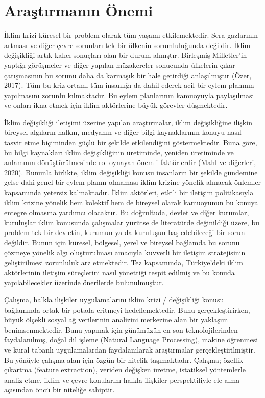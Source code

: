 \documentclass[
]{book}
\begin{document}
\hypertarget{araux15ftux131rmanux131n-uxf6nemi}{%
\section{Araştırmanın Önemi}\label{araux15ftux131rmanux131n-uxf6nemi}}

İklim krizi küresel bir problem olarak tüm yaşamı etkilemektedir. Sera gazlarının artması ve diğer çevre sorunları tek bir ülkenin sorumluluğunda değildir. İklim değişikliği artık kalıcı sonuçları olan bir durum almıştır. Birleşmiş Milletler'in yaptığı görüşmeler ve diğer yapılan müzakereler sonucunda ülkelerin çıkar çatışmasının bu sorunu daha da karmaşık bir hale getirdiği anlaşılmıştır (Özer, 2017). Tüm bu kriz ortamı tüm insanlığı da dahil ederek acil bir eylem planının yapılmasını zorunlu kılmaktadır. Bu eylem planlarının kamuoyuyla paylaşılması ve onları ikna etmek için iklim aktörlerine büyük görevler düşmektedir.

İklim değişikliği iletişimi üzerine yapılan araştırmalar, iklim değişikliğine ilişkin bireysel algıların halkın, medyanın ve diğer bilgi kaynaklarının konuyu nasıl tasvir etme biçiminden güçlü bir şekilde etkilendiğini göstermektedir. Buna göre, bu bilgi kaynakları iklim değişikliğinin üretiminde, yeniden üretiminde ve anlamının dönüştürülmesinde rol oynayan önemli faktörlerdir (Mahl ve diğerleri, 2020).
Bununla birlikte, iklim değişikliği konusu insanların bir şekilde gündemine gelse dahi genel bir eylem planın olmaması iklim krizine yönelik alınacak önlemler kapsamında yetersiz kalmaktadır. İklim aktörleri, etkili bir iletişim politikasıyla iklim krizine yönelik hem kolektif hem de bireysel olarak kamuoyunun bu konuya entegre olmasına yardımcı olacaktır. Bu doğrultuda, devlet ve diğer kurumlar, kuruluşlar iklim konusunda çalışmalar yürütse de literatürde değinildiği üzere, bu problem tek bir devletin, kurumun ya da kuruluşun baş edebileceği bir sorun değildir. Bunun için küresel, bölgesel, yerel ve bireysel bağlamda bu sorunu çözmeye yönelik algı oluşturulması amacıyla kuvvetli bir iletişim stratejisinin geliştirilmesi zorunluluk arz etmektedir. Tez kapsamında, Türkiye'deki iklim aktörlerinin iletişim süreçlerini nasıl yönettiği tespit edilmiş ve bu konuda yapılabilecekler üzerinde önerilerde bulunulmuştur.

Çalışma, halkla ilişkiler uygulamalarını iklim krizi / değişikliği konusu bağlamında ortak bir potada eritmeyi hedeflemektedir. Bunu gerçekleştirirken, büyük ölçekli sosyal ağ verilerinin analizini merkezine alan bir yaklaşım benimsenmektedir. Bunu yapmak için günümüzün en son teknolojilerinden faydalanılmış, doğal dil işleme (Natural Language Processing), makine öğrenmesi ve kural tabanlı uygulamalardan faydalanılarak araştırmalar gerçekleştirilmiştir. Bu yönüyle çalışma alan için özgün bir nitelik taşımaktadır. Çalışma; özellik çıkartma (feature extraction), veriden değişken üretme, istatiksel yöntemlerle analiz etme, iklim ve çevre konularını halkla ilişkiler perspektifiyle ele alma açısından öncü bir niteliğe sahiptir.
\end{document}
